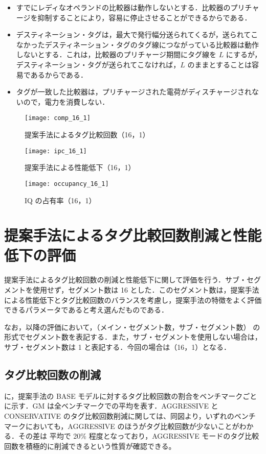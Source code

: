 \begin{itemize}
  \item すでにレディなオペランドの比較器は動作しないとする．比較器のプリチャージを抑制することにより，容易に停止させることができるからである．
  \item デスティネーション・タグは，最大で発行幅分送られてくるが，送られてこなかったデスティネーション・タグのタグ線につながっている比較器は動作しないとする．これは，比較器のプリチャージ期間にタグ線を $L$ にするが，デスティネーション・タグが送られてこなければ，$L$ のままとすることは容易であるからである．
  \item タグが一致した比較器は，プリチャージされた電荷がディスチャージされないので，電力を消費しない．
\end{itemize}

\begin{figure}[htb]
  \centering
  \texttt{[image: comp\_16\_1]}
  \caption{提案手法によるタグ比較回数（16，1）}
  \label{fig:comp_16_1}
\end{figure}
\begin{figure}[htb]
  \centering
  \texttt{[image: ipc\_16\_1]}
  \caption{提案手法による性能低下（16，1）}
  \label{fig:ipc_16_1}
\end{figure}
\begin{figure}[htb]
  \centering
  \texttt{[image: occupancy\_16\_1]}
  \caption{IQ の占有率（16，1）}
  \label{fig:occupancy_16_1}
\end{figure}

\section{提案手法によるタグ比較回数削減と性能低下の評価}
\label{sec:eval_segIQ}
提案手法によるタグ比較回数の削減と性能低下に関して評価を行う．サブ・セグメントを使用せず，セグメント数は 16 とした．このセグメント数は，提案手法による性能低下とタグ比較回数のバランスを考慮し，提案手法の特徴をよく評価できるパラメータであると考え選んだものである．

なお，以降の評価において，（メイン・セグメント数，サブ・セグメント数） の形式でセグメント数を表記する．また，サブ・セグメントを使用しない場合は，サブ・セグメント数は 1 と表記する．今回の場合は（16，1）となる．

\subsection{タグ比較回数の削減}
に，提案手法の BASE モデルに対するタグ比較回数の割合をベンチマークごとに示す．GM は全ベンチマークでの平均を表す．AGGRESSIVE と CONSERVATIVE のタグ比較回数削減に関しては、同図より，いずれのベンチマークにおいても，AGGRESSIVE のほうがタグ比較回数が少ないことがわかる．その差は 平均で 20\% 程度となっており，AGGRESSIVE モードのタグ比較回数を積極的に削減できるという性質が確認できる。

